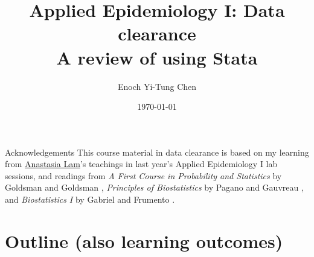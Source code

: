 

\title[Applied Epi I: Data Management]{Applied Epidemiology I: Data clearance\\ A review of using Stata}
\date{\today}
\author[Enoch Yi-Tung Chen]{Enoch Yi-Tung Chen}




\begin{frame}
\maketitle 
\end{frame}

\begin{frame}{Acknowledgements}
This course material in data clearance is based on my learning from \href{https://staff.ki.se/people/analam}{Anastasia Lam}'s teachings in last year's Applied Epidemiology I lab sessions, and readings from \textit{A First Course in Probability and Statistics} by Goldsman and Goldsman \cite{Goldsman2020}, \textit{Principles of Biostatistics} by Pagano and Gauvreau \cite{Pagano2000}, and \textit{Biostatistics I} by Gabriel and Frumento \cite{Gabriel2020}.

\end{frame}

\section*{Outline (also learning outcomes)}
\begin{frame}{\secname}
 \begin{columns}[t]
        \begin{column}{.5\textwidth}
            \tableofcontents[sections={1-4}]
        \end{column}
        \begin{column}{.5\textwidth}
            \tableofcontents[sections={5-7}]
        \end{column}
\end{columns}
\end{frame}


